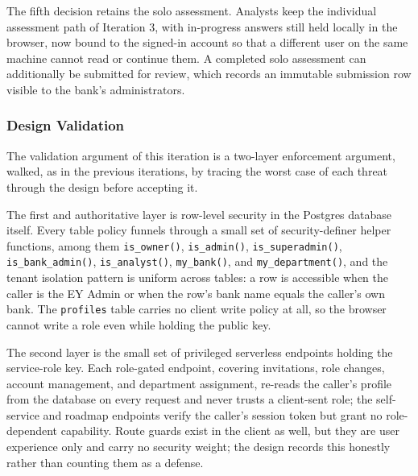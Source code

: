 The fifth decision retains the solo assessment. Analysts keep the individual assessment path of Iteration 3, with in-progress answers still held locally in the browser, now bound to the signed-in account so that a different user on the same machine cannot read or continue them. A completed solo assessment can additionally be submitted for review, which records an immutable submission row visible to the bank's administrators.

\subsubsection{Design Validation}

The validation argument of this iteration is a two-layer enforcement argument, walked, as in the previous iterations, by tracing the worst case of each threat through the design before accepting it.

\begin{sloppypar}
The first and authoritative layer is row-level security in the Postgres database itself. Every table policy funnels through a small set of security-definer helper functions, among them \texttt{is\_owner()}, \texttt{is\_admin()}, \texttt{is\_superadmin()}, \texttt{is\_bank\_admin()}, \texttt{is\_analyst()}, \texttt{my\_bank()}, and \texttt{my\_department()}, and the tenant isolation pattern is uniform across tables: a row is accessible when the caller is the EY Admin or when the row's bank name equals the caller's own bank. The \texttt{profiles} table carries no client write policy at all, so the browser cannot write a role even while holding the public key.
\end{sloppypar}

The second layer is the small set of privileged serverless endpoints holding the service-role key. Each role-gated endpoint, covering invitations, role changes, account management, and department assignment, re-reads the caller's profile from the database on every request and never trusts a client-sent role; the self-service and roadmap endpoints verify the caller's session token but grant no role-dependent capability. Route guards exist in the client as well, but they are user experience only and carry no security weight; the design records this honestly rather than counting them as a defense.

